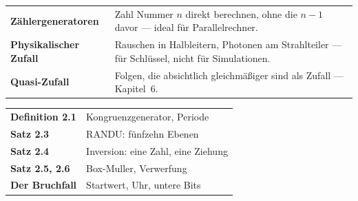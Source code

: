 \begin{forschung}
\begin{center}
{\small
\renewcommand{\arraystretch}{1.45}
\begin{tabular}{@{}P{3.0cm}P{5.2cm}@{}}
\toprule
\textbf{Zählergeneratoren} & Zahl Nummer $n$ direkt berechnen, ohne die $n-1$ davor --- ideal für Parallelrechner.\\
\textbf{Physikalischer Zufall} & Rauschen in Halbleitern, Photonen am Strahlteiler --- für Schlüssel, nicht für Simulationen.\\
\textbf{Quasi-Zufall} & Folgen, die absichtlich gleichmäßiger sind als Zufall --- Kapitel~6.\\
\bottomrule
\end{tabular}}
\end{center}

\begin{center}
\begin{minipage}{0.88\textwidth}
\end{minipage}
\end{center}
\end{forschung}

\begin{merksatz}
\begin{center}
\renewcommand{\arraystretch}{1.5}
\begin{tabular}{@{}P{3.0cm}P{5.6cm}@{}}
\toprule
\textbf{Definition 2.1} & Kongruenzgenerator, Periode\\
\textbf{Satz 2.3} & RANDU: fünfzehn Ebenen\\
\textbf{Satz 2.4} & Inversion: eine Zahl, eine Ziehung\\
\textbf{Satz 2.5, 2.6} & Box-Muller, Verwerfung\\
\textbf{Der Bruchfall} & Startwert, Uhr, untere Bits\\
\bottomrule
\end{tabular}
\end{center}

\begin{center}
\begin{minipage}{0.88\textwidth}
\end{minipage}
\end{center}
\end{merksatz}

